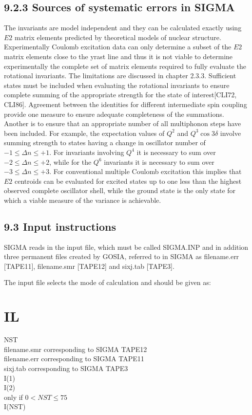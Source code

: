 \documentclass[10pt]{article}
\begin{document}
\subsection*{9.2.3 Sources of systematic errors in SIGMA}
The invariants are model independent and they can be calculated exactly using $E 2$ matrix elements predicted by theoretical models of nuclear structure. Experimentally Coulomb excitation data can only determine a subset of the $E 2$ matrix elements close to the yrast line and thus it is not viable to determine experimentally the complete set of matrix elements required to fully evaluate the rotational invariants. The limitations are discussed in chapter 2.3.3. Sufficient states must be included when evaluating the rotational invariants to ensure complete summing of the appropriate strength for the state of interest[CLI72, CLI86]. Agreement between the identities for different intermediate spin coupling provide one measure to ensure adequate completeness of the summations. Another is to ensure that an appropriate number of all multiphonon steps have been included. For example, the expectation values of $Q^{2}$ and $Q^{3} \cos 3 \delta$ involve summing strength to states having a change in oscillator number of $-1 \leq \Delta n \leq+1$. For invariants involving $Q^{4}$ it is necessary to sum over $-2 \leq \Delta n \leq+2$, while for the $Q^{6}$ invariants it is necessary to sum over $-3 \leq \Delta n \leq+3$. For conventional multiple Coulomb excitation this implies that $E 2$ centroids can be evaluated for excited states up to one less than the highest observed complete oscillator shell, while the ground state is the only state for which a viable measure of the variance is achievable.

\subsection*{9.3 Input instructions}
SIGMA reads in the input file, which must be called SIGMA.INP and in addition three permanent files created by GOSIA, referred to in SIGMA as filename.err [TAPE11], filename.smr [TAPE12] and sixj.tab [TAPE3].

The input file selects the mode of calculation and should be given as:

\section*{IL}
NST\\
filename.smr corresponding to SIGMA TAPE12\\
filename.err corresponding to SIGMA TAPE11\\
sixj.tab corresponding to SIGMA TAPE3\\
I(1)\\
I(2)\\
only if $0<N S T \leq 75$\\
I(NST)
\end{document}
